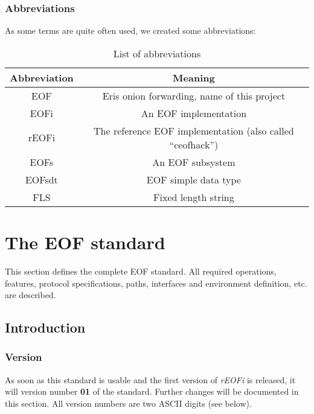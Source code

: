 \documentclass[12pt,a4paper]{book}
\begin{document}
\subsection{Abbreviations}
As some terms are quite often used, we created some abbreviations:
%
%
%
%
%
%
\begin{longtable}{|c|c|}
\caption{List of abbreviations}\\
\hline
\textbf{Abbreviation} & \textbf{Meaning}\\
\hline
EOF & Eris onion forwarding, name of this project\\
\hline
EOFi & An EOF implementation\\
\hline
rEOFi & The reference EOF implementation (also called "`ceofhack"')\\
\hline
EOFs & An EOF subsystem\\
\hline
EOFsdt & EOF simple data type\\
\hline
FLS & Fixed length string\\
\hline
\end{longtable}
\chapter{The EOF standard}
This section defines the complete EOF standard. All required operations,
features, protocol specifications, paths, interfaces and environment definition,
etc. are described.
\section{Introduction}
\subsection{Version}
As soon as this standard is usable and the first version of \emph{rEOFi}
is released, it will version number \textbf{01} of the standard.
Further changes will be documented in this section. All version numbers
are two ASCII digits (see below).
\end{document}

